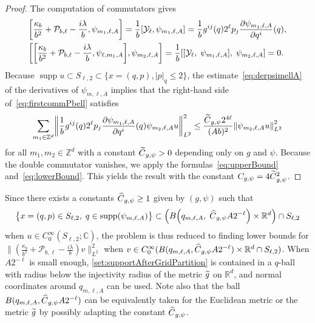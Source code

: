 \documentclass[10pt]{amsart}
\theoremstyle{definition}\newtheorem{defi}[theo]{Definition}\newtheorem{rema}[theo]{Remark}\newtheorem{exam}[theo]{Example}\newtheorem{exem}[theo]{Example}\newtheorem{nota}[theo]{Notation}
\newcommand{\C}{\mathbb{C}}
\newcommand{\Z}{\mathbb{Z}}
\newcommand{\R}{\mathbb{R}}
\newcommand{\clY}{\mathcal{Y}}
\newcommand{\clP}{\mathcal{P}}
\DeclareMathOperator{\suppp}{supp}
\newcommand\norm[1]{\left\lVert#1\right\rVert}
\let\oldtilde\tilde
\renewcommand*{\tilde}[1]{\mathchoice{\widetilde{#1}}{\widetilde{#1}}{\oldtilde{#1}}{\oldtilde{#1}}}
\let\oldhat\hat
\renewcommand*{\hat}[1]{\mathchoice{\widehat{#1}}{\widehat{#1}}{\oldhat{#1}}{\oldhat{#1}}}
\let\originalleft\left
\let\originalright\right
\renewcommand{\left}{\mathopen{}\mathclose\bgroup\originalleft}
\renewcommand{\right}{\aftergroup\egroup\originalright}
\begin{document}
\begin{proof}
The computation of commutators gives
\begin{align}\label{eq:firstcommPbell}
& \left[\frac{\kappa_{b}}{b^{2}} + \clP_{b,\ell}-\frac{i\lambda}{b},\psi_{m_{1},\ell,A}\right] = \frac{1}{b}\left[\clY_{\ell},\psi_{m_{1},\ell,A}\right] = \frac{1}{b}g^{ij}(q)2 ^{\ell}p_{j}\frac{\partial \psi_{m_{1},\ell,A}}{\partial q^{i}}(q), \\
& \left[\left[\frac{\kappa_{b}}{b^{2}} + \clP_{b,\ell}-\frac{i\lambda}{b},\psi_{\ell,m_{1},A}\right],\psi_{m_{2},\ell,A}\right] = \frac{1}{b}\left[\left[\clY_{\ell},\;\psi_{m_{1},\ell,A}\right],\;\psi_{m_{2},\ell,A}\right]=0.
\end{align}
Because $\suppp u\subset S_{\ell,2}\subset \{x=(q,p), |p|_q\leq 2\}$, the estimate~\eqref{eq:derpsimellA} of the derivatives of $\psi_{m,\ell,A}$ implies that the right-hand side of~\eqref{eq:firstcommPbell} satisfies
\[
\sum_{m_1\in \Z^d}\norm{\frac{1}{b}g^{ij}(q)2 ^{\ell}p_{j}\frac{\partial \psi_{m_{1},\ell,A}}{\partial q^{i}}(q)\psi_{m_2,\ell,A}u}_{L^2}^2 \leq \frac{\tilde{C}_{g,\psi}2^{4\ell}}{(Ab)^2}\norm{\psi_{m_2,\ell,A}u}_{L^2}^2
\]
for all $m_1,m_2\in \Z^d$ with a constant $\tilde{C}_{g,\psi}>0$ depending only on $g$ and $\psi$. Because the double commutator vanishes, we apply the formulas~\eqref{eq:upperBound} and~\eqref{eq:lowerBound}. This yields the result with the constant $C_{g,\psi}=4\tilde{C}_{g,\psi}^2$.
\end{proof}

Since there exists a constants $\hat{C}_{g,\psi}\geq 1$ given by $(g,\psi)$ such that
\begin{equation}\label{set:supportAfterGridPartition}
\bigl\{ x=(q,p)\in S_{\ell,2},\; q\in \suppp(\psi_{m,\ell,A}) \bigr\}\subset \left(B\left(q_{m,\ell,A},\; \hat{C}_{g,\psi}A2^{-\ell}\right)\times \R^d\right)\cap S_{\ell,2}
\end{equation}
when $u \in C^\infty_0(S_{\ell,2}; \C)$, the problem is thus reduced to finding lower bounds for $\|(\frac{\kappa_{b}}{b^{2}}+\clP_{b,\ell} - \frac{i\lambda}{b}) v\|_{L^2}^2$ when $v \in C^\infty_0 (B (q_{m,\ell,A}, \hat{C}_{g,\psi}A2^{-\ell})\times \R^d \cap S_{\ell,2})$. When $A2^{-\ell}$ is small enough, \eqref{set:supportAfterGridPartition} is contained in a $q$-ball with radius below the injectivity radius of the metric $\tilde{g}$ on $\R^d$, and normal coordinates around $q_{m,\ell,A}$ can be used. Note also that the ball $B(q_{m,\ell,A}, \hat{C}_{g,\psi}A2^{-\ell})$ can be equivalently taken for the Euclidean metric or the metric $\tilde{g}$ by possibly adapting the constant $\hat{C}_{g,\psi}$.
\end{document}
